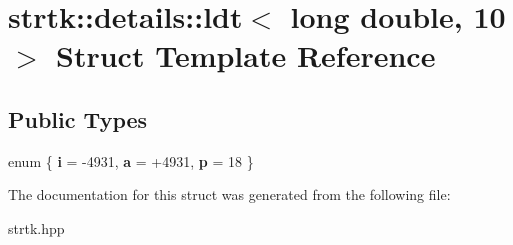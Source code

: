 \hypertarget{structstrtk_1_1details_1_1ldt_3_01long_01double_00_0110_01_4}{\section{strtk\-:\-:details\-:\-:ldt$<$ long double, 10 $>$ Struct Template Reference}
\label{structstrtk_1_1details_1_1ldt_3_01long_01double_00_0110_01_4}
}
\subsection*{Public Types}
\begin{DoxyCompactItemize}
\item 
enum \{ {\bfseries i} = -\/4931, 
{\bfseries a} = +4931, 
{\bfseries p} = 18
 \}
\end{DoxyCompactItemize}


The documentation for this struct was generated from the following file\-:\begin{DoxyCompactItemize}
\item 
strtk.\-hpp\end{DoxyCompactItemize}
